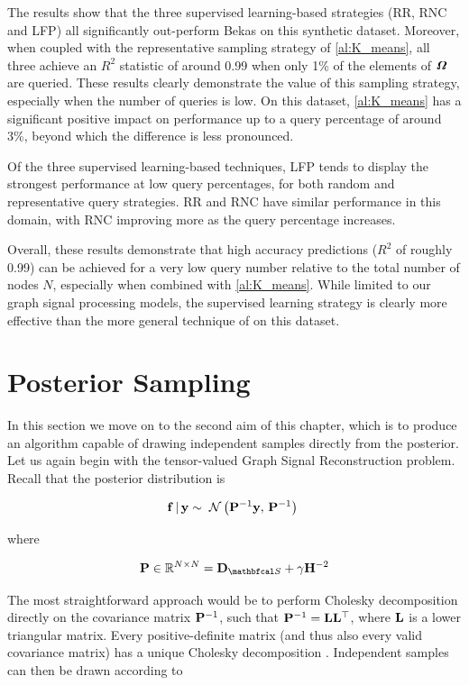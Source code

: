 The results show that the three supervised learning-based strategies (RR, RNC and LFP) all significantly out-perform Bekas on this synthetic dataset. Moreover, when coupled with the representative sampling strategy of \cref{al:K_means}, all three achieve an $R^2$ statistic of around 0.99 when only 1\% of the elements of $\bm{\mathit{\Omega}}$ are queried. These results clearly demonstrate the value of this sampling strategy, especially when the number of queries is low. On this dataset, \cref{al:K_means} has a significant positive impact on performance up to a query percentage of around 3\%, beyond which the difference is less pronounced. 

Of the three supervised learning-based techniques, LFP tends to display the strongest performance at low query percentages, for both random and representative query strategies. RR and RNC have similar performance in this domain, with RNC improving more as the query percentage increases. 

Overall, these results demonstrate that high accuracy predictions ($R^2$ of roughly 0.99) can be achieved for a very low query number relative to the total number of nodes $N$, especially when combined with \cref{al:K_means}. While limited to our graph signal processing models, the supervised learning strategy is clearly more effective than the more general technique of \cite{Bekas2007} on this dataset. 


\section{Posterior Sampling}

\label{sec:sampling}


In this section we move on to the second aim of this chapter, which is to produce an algorithm capable of drawing independent samples directly from the posterior. Let us again begin with the tensor-valued Graph Signal Reconstruction problem. Recall that the posterior distribution is 

\begin{equation}
    \mathbf{f} \, | \, \mathbf{y} \sim \; \mathcal{N}\left(\mathbf{P}^{-1} \mathbf{y}, \, \mathbf{P}^{-1}\right) \;
\end{equation}

where 

\begin{equation}
    \PP \in \R^{N \times N} = \D_{\St} + \gamma \HH^{-2}
\end{equation}

The most straightforward approach would be to perform Cholesky decomposition directly on the covariance matrix $\mathbf{P}^{-1}$, such that $\mathbf{P}^{-1} = \mathbf{L} \mathbf{L}^\top$, where $\mathbf{L}$ is a lower triangular matrix. Every positive-definite matrix (and thus also every valid covariance matrix) has a unique Cholesky decomposition \citep{Horn2012}. Independent samples can then be drawn according to 

